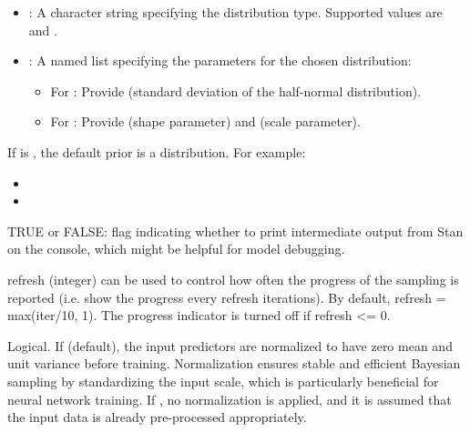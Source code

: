 \documentclass[a4paper]{book}
\begin{document}
\begin{Arguments}
\begin{ldescription}
\begin{itemize}
\item{} : A character string specifying the distribution type. Supported values are
 and .
\item{} : A named list specifying the parameters for the chosen distribution:
\begin{itemize}

\item{} For : Provide  (standard deviation of the half-normal distribution).
\item{} For : Provide  (shape parameter) and  (scale parameter).

\end{itemize}


\end{itemize}

If  is , the default prior is a  distribution.
For example:
\begin{itemize}

\item{} 
\item{} 

\end{itemize}


\item[\code{verbose}] TRUE or FALSE: flag indicating whether to print intermediate output from Stan on the console, which might be helpful for model debugging.

\item[\code{refresh}] refresh (integer) can be used to control how often the progress of the sampling is reported (i.e. show the progress every refresh iterations). By default, refresh = max(iter/10, 1). The progress indicator is turned off if refresh <= 0.

\item[\code{normalize}] Logical. If  (default), the input predictors
are normalized to have zero mean and unit variance before training.
Normalization ensures stable and efficient Bayesian sampling by standardizing
the input scale, which is particularly beneficial for neural network training.
If , no normalization is applied, and it is assumed that the input data
is already pre-processed appropriately.


\end{ldescription}
\end{Arguments}
\end{document}
